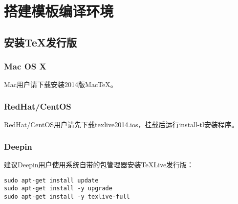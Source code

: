 \chapter{搭建模板编译环境}

\section{安装TeX发行版}

\subsection{Mac OS X}

Mac用户请下载安装2014版MacTeX。



\subsection{RedHat/CentOS}

RedHat/CentOS用户请先下载texlive2014.ios，挂载后运行install-tl安装程序。

% 

\subsection{Deepin}

建议Deepin用户使用系统自带的包管理器安装TeXLive发行版：

\begin{lstlisting}[basicstyle=\small\ttfamily, numbers=none]
sudo apt-get install update
sudo apt-get install -y upgrade
sudo apt-get install -y texlive-full
\end{lstlisting}

